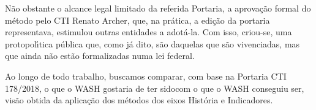 \documentclass[
12pt,		%
openright,	%
twoside,  %
a4paper,			%
chapter=TITLE,		%
english,			%
french,				%
spanish,			%
brazil				%
]{USPSC-classe/USPSC}
\begin{document}
N\~ao obstante o alcance legal limitado da referida Portaria, a aprova\c{c}\~ao formal do m\'etodo pelo CTI Renato Archer, que, na pr\'atica, a edi\c{c}\~ao da portaria representava, estimulou outras entidades a adot\'a-la. Com isso, criou-se, uma protopol\'{\i}tica p\'ublica que, como j\'a dito, s\~ao \textquotedbl daquelas que s\~ao vivenciadas, mas que ainda n\~ao est\~ao formalizadas numa lei federal\textquotedbl .









Ao longo de todo trabalho, buscamos comparar, com base na Portaria CTI 178/2018, \textquotedbl o que o WASH gostaria de ter sido\textquotedbl  com \textquotedbl o que o WASH conseguiu ser\textquotedbl , vis\~ao obtida da aplica\c{c}\~ao dos m\'etodos dos eixos Hist\'oria e Indicadores.
\end{document}
